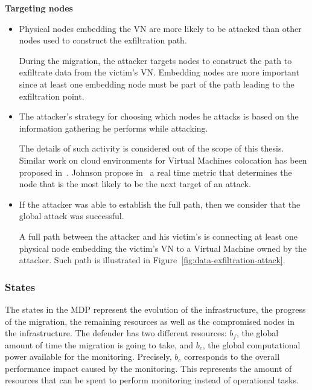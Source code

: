 \textbf{Targeting nodes}
\begin{itemize}
    \item  Physical nodes embedding the VN are more likely to be attacked than other nodes used to construct the exfiltration path.
    
    During the migration, the attacker targets nodes to construct the path to exfiltrate data from the victim's VN.
    Embedding nodes are more important since at least one embedding node must be part of the path leading to the exfiltration point.
    
    \item The attacker's strategy for choosing which nodes he attacks is based on the information gathering he performs while attacking. 
    
    The details of such activity is considered out of the scope of this thesis.
    Similar work on cloud environments for Virtual Machines colocation has been proposed in~\cite{getoffmucloud-Ristenpart2009, incentivemtd-Zhang2012}.
    Johnson \etal propose in~\cite{mitigateAPT-johnson2013} a real time metric that determines the node that is the most likely to be the next target of an attack.
    
    \item
    If the attacker was able to establish the full path, then we consider that the global attack was successful.
    
    A full path between the attacker and his victim's is connecting at least one physical node embedding the victim's VN to a Virtual Machine owned by the attacker. Such path is illustrated in Figure~\ref{fig:data-exfiltration-attack}.
\end{itemize}



\subsubsection{States}
\label{sec:stateset}
The states in the MDP represent the evolution of the infrastructure, \ie the progress of the migration, the remaining resources as well as the compromised nodes in the infrastructure.
The defender has two different resources: $b_f$, the global amount of time the migration is going to take, and $b_c$, the global computational power available for the monitoring.
Precisely, $b_c$ corresponds to the overall performance impact caused by the monitoring. %
This represents the amount of resources that can be spent to perform monitoring instead of operational tasks.

